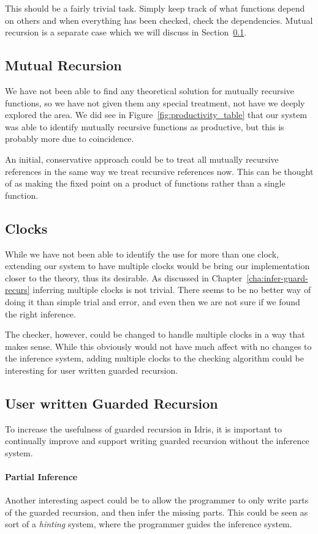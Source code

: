 This should be a fairly trivial task. Simply keep track of what functions depend
on others and when everything has been checked, check the dependencies. Mutual
recursion is a separate case which we will discuss in
Section~\ref{sec:mutual-recursion}.
\subsection{Mutual Recursion}
\label{sec:mutual-recursion}
We have not been able to find any theoretical solution for mutually recursive
functions, so we have not given them any special treatment, not have we deeply
explored the area. We did see in Figure~\ref{fig:productivity_table} that our
system was able to identify mutually recursive functions as productive, but this
is probably more due to coincidence.

An initial, conservative approach could be to treat all mutually recursive
references in the same way we treat recursive references now. This can be
thought of as making the fixed point on a product of functions rather than a
single function.
\subsection{Clocks}
While we have not been able to identify the use for more than one clock,
extending our system to have multiple clocks would be bring our implementation
closer to the theory, thus its desirable. As discussed in
Chapter~\ref{cha:infer-guard-recurs} inferring multiple clocks is not
trivial. There seems to be no better way of doing it than simple trial and
error, and even then we are not sure if we found the right inference. 

The checker, however, could be changed to handle multiple clocks in a way that
makes sense. While this obviously would not have much affect with no changes to
the inference system, adding multiple clocks to the checking algorithm could
be interesting for user written guarded recursion.
\subsection{User written Guarded Recursion}
To increase the usefulness of guarded recursion in Idris, it is important to
continually improve and support writing guarded recursion without the inference
system.
\paragraph{Partial Inference}
Another interesting aspect could be to allow the programmer to only write parts
of the guarded recursion, and then infer the missing parts. This could be seen
as sort of a \emph{hinting} system, where the programmer guides the inference system.

